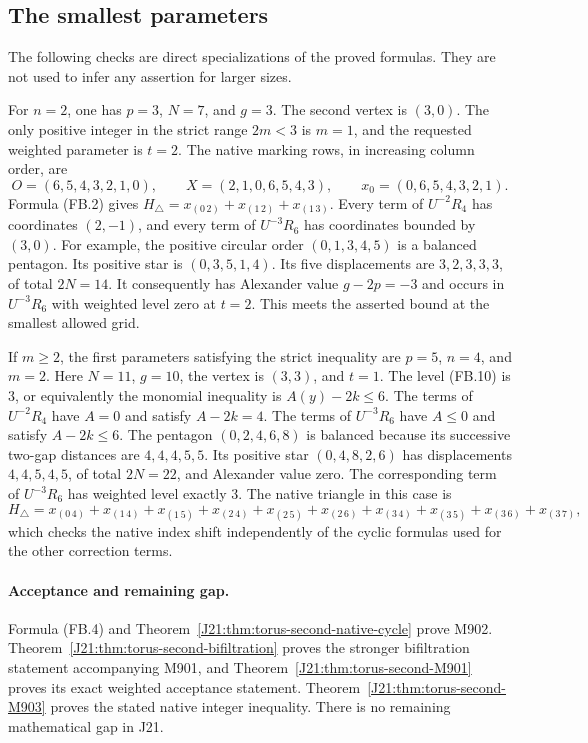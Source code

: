 \documentclass[11pt,oneside]{report}
\theoremstyle{definition}
\numberwithin{equation}{section}
\begin{document}
\subsection{The smallest parameters}

The following checks are direct specializations of the proved formulas.
They are not used to infer any assertion for larger sizes.

For $n=2$, one has $p=3$, $N=7$, and $g=3$.
The second vertex is $(3,0)$.
The only positive integer in the strict range $2m<3$ is $m=1$,
and the requested weighted parameter is $t=2$.
The native marking rows, in increasing column order, are
\[
 O=(6,5,4,3,2,1,0),\qquad
 X=(2,1,0,6,5,4,3),\qquad
 x_0=(0,6,5,4,3,2,1).
\]
Formula (FB.2) gives
$H_{\triangle}=x_{(0\,2)}+x_{(1\,2)}+x_{(1\,3)}$.
Every term of $U^{-2}R_4$ has coordinates $(2,-1)$, and every
term of $U^{-3}R_6$ has coordinates bounded by $(3,0)$.
For example, the positive circular order $(0,1,3,4,5)$ is a balanced
pentagon. Its positive star is $(0,3,5,1,4)$.
Its five displacements are $3,2,3,3,3$, of total $2N=14$.
It consequently has Alexander value $g-2p=-3$ and occurs in
$U^{-3}R_6$ with weighted level zero at $t=2$.
This meets the asserted bound at the smallest allowed grid.

If $m\geq2$, the first parameters satisfying the strict inequality
are $p=5$, $n=4$, and $m=2$.
Here $N=11$, $g=10$, the vertex is $(3,3)$, and $t=1$.
The level (FB.10) is $3$, or equivalently the monomial inequality is
$A(y)-2k\leq6$.
The terms of $U^{-2}R_4$ have $A=0$ and satisfy $A-2k=4$.
The terms of $U^{-3}R_6$ have $A\leq0$ and satisfy $A-2k\leq6$.
The pentagon $(0,2,4,6,8)$ is balanced because its successive
two-gap distances are $4,4,4,5,5$.
Its positive star $(0,4,8,2,6)$ has displacements $4,4,5,4,5$,
of total $2N=22$, and Alexander value zero.
The corresponding term of $U^{-3}R_6$ has weighted level exactly
$3$.
The native triangle in this case is
\[
 H_{\triangle}
  =x_{(0\,4)}
   +x_{(1\,4)}+x_{(1\,5)}
   +x_{(2\,4)}+x_{(2\,5)}+x_{(2\,6)}
   +x_{(3\,4)}+x_{(3\,5)}+x_{(3\,6)}+x_{(3\,7)},
\]
which checks the native index shift independently of the cyclic
formulas used for the other correction terms.

\paragraph{Acceptance and remaining gap.}
Formula (FB.4) and Theorem~\ref{J21:thm:torus-second-native-cycle}
prove M902. Theorem~\ref{J21:thm:torus-second-bifiltration} proves the
stronger bifiltration statement accompanying M901, and
Theorem~\ref{J21:thm:torus-second-M901} proves its exact weighted
acceptance statement. Theorem~\ref{J21:thm:torus-second-M903} proves
the stated native integer inequality.
There is no remaining mathematical gap in J21.
\end{document}
